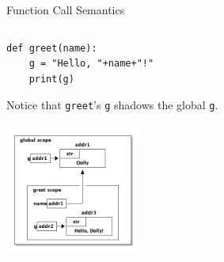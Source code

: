 \documentclass[smaller, aspectratio=1610]{beamer}
\begin{document}
\begin{frame}[label={sec:org1a3f625},fragile]{Function Call Semantics}
\begin{columns}
\begin{column}{0.3\columnwidth}
\begin{block}{}
\lstset{language=Python,label= ,caption= ,captionpos=b,numbers=none,basicstyle=\ttfamily\scriptsize, numbers=left}
\begin{lstlisting}
def greet(name):
    g = "Hello, "+name+"!"
    print(g)
\end{lstlisting}

Notice that \texttt{greet}'s \texttt{g} shadows the global \texttt{g}.
\begin{center}
\includegraphics[width=1.75in]{diagrams/greet-scope.png}
\end{center}
\end{block}
\end{column}
\end{columns}
\end{frame}
\end{document}
